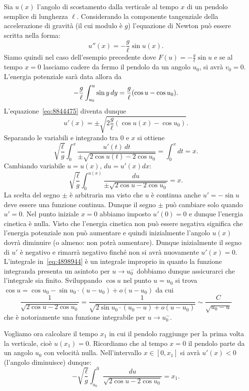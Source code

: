 \begin{example}
Sia $u(x)$
l'angolo di scostamento dalla verticale
al tempo $x$ di un pendolo semplice di lunghezza $\ell$.
Considerando la componente tangenziale della accelerazione di gravità
(il cui modulo è $g$)
l'equazione di Newton può essere scritta nella forma:
\[
  u''(x) = -\frac{g}{\ell} \sin u(x).
\]
Siamo quindi nel caso dell'esempio precedente dove $F(u) = -\frac{g}{\ell} \sin u$
e se al tempo $x=0$ lasciamo cadere da fermo il pendolo da un angolo $u_0$,
si avrà $v_0=0$. L'energia potenziale sarà data allora da
\[
-\frac{g}{\ell}\int_{u_0}^u \sin y\, dy = \frac{g}{\ell}{\left( \cos u - \cos u_0 \right)}.
\]
L'equazione~\eqref{eq:8844475} diventa dunque
\[
  u'(x) = \pm \sqrt{2\frac{g}{\ell}(\cos u(x) - \cos u_0)}.
\]
Separando le variabili e integrando tra $0$ e $x$ si ottiene
\[
\sqrt{\frac \ell g}\int_0^x \frac{u'(t)\, dt}{\pm\sqrt{2\cos u(t)-2\cos u_0}}
= \int_0^x dt  = x.
\]
Cambiando variabile $u=u(x)$, $du = u'(x) dx$:
\begin{equation}\label{eq:4898944}
\sqrt{\frac \ell g}\int_0^{u(x)} \frac{du}{\pm\sqrt{2\cos u-2\cos u_0}} = x.
\end{equation}
La scelta del segno $\pm$ è arbitraria ma visto che $u$ è continua
anche $u'=-\sin u$ deve essere una funzione continua. Dunque il segno
$\pm$ può cambiare solo quando $u'=0$. Nel punto iniziale $x=0$ abbiamo
imposto $u'(0) = 0$ e dunque l'energia cinetica è nulla. Visto che l'energia
cinetica non può essere negativa significa che l'energia potenziale
non può aumentare e quindi inizialmente l'angolo $u(x)$ dovrà diminuire
(o almeno: non potrà aumentare). Dunque inizialmente il segno di $u'$ è negativo
e rimarrà negativo finché non si avrà nuovamente $u'(x)=0$.
L'integrale in~\eqref{eq:4898944} è un integrale improprio in quanto
la funzione integranda presenta un asintoto per $u\to u_0^-$ dobbiamo dunque
assicurarci che l'integrale sia finito. Sviluppando $\cos u$ nel punto $u=u_0$
si trova $\cos u = \cos u_0  - \sin u_0 \cdot (u-u_0) + o(u-u_0)$ da cui
\[
 \frac{1}{\sqrt{2 \cos u - 2 \cos u_0}}
 =\frac{1}{\sqrt{2\sin u_0\cdot (u_0-u) + o(u-u_0)}}
 \sim \frac{C}{\sqrt{u_0-u}}
\]
che è notoriamente una funzione integrabile per $u\to u_0^-$.

Vogliamo ora calcolare il tempo $x_1$ in cui il pendolo raggiunge per la prima
volta la verticale, cioè $u(x_1)=0$.
Ricordiamo che al tempo $x=0$ il pendolo parte da un angolo $u_0$
con velocità nulla. Nell'intervallo $x\in[0,x_1]$ si avrà $u'(x)<0$
(l'angolo diminuisce) dunque:
\[
-\sqrt{\frac{\ell}{g}}\int_{u_0}^{0} \frac{du}{\sqrt{2\cos u - 2\cos u_0}}
= x_1.
\]


\end{example}
